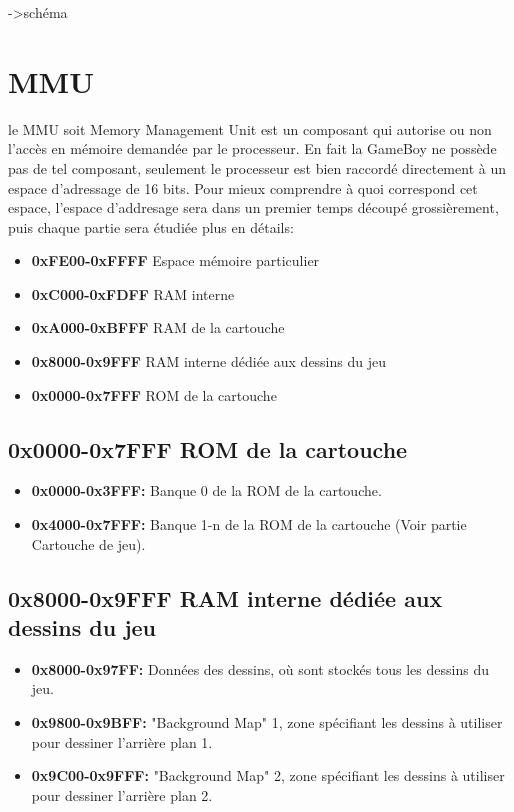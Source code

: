 \documentclass{report}
\begin{document}
->schéma

\section{MMU}
le MMU soit Memory Management Unit est un composant qui autorise ou non l'accès en mémoire demandée par le processeur.
En fait la GameBoy ne possède pas de tel composant, seulement le processeur est bien raccordé directement à un espace d'adressage de 16 bits.
Pour mieux comprendre à quoi correspond cet espace, l'espace d'addresage sera
dans un premier temps découpé grossièrement, puis chaque partie sera étudiée
plus en détails:\\
\begin{itemize}
\item \textbf{0xFE00-0xFFFF} Espace mémoire particulier
\item \textbf{0xC000-0xFDFF} RAM interne
\item \textbf{0xA000-0xBFFF} RAM de la cartouche
\item \textbf{0x8000-0x9FFF} RAM interne dédiée aux dessins du jeu
\item \textbf{0x0000-0x7FFF} ROM de la cartouche
\end{itemize}

\subsection{0x0000-0x7FFF ROM de la cartouche}
\begin{itemize}
\item \textbf{0x0000-0x3FFF:} Banque 0 de la ROM de la cartouche.
\item \textbf{0x4000-0x7FFF:} Banque 1-n de la ROM de la cartouche (Voir partie Cartouche de jeu).
\end{itemize}

\subsection{0x8000-0x9FFF RAM interne dédiée aux dessins du jeu}
\begin{itemize}
\item \textbf{0x8000-0x97FF:} Données des dessins, où sont stockés tous les dessins du jeu.
\item \textbf{0x9800-0x9BFF:} "Background Map" 1, zone spécifiant les dessins à utiliser pour dessiner l'arrière plan 1.
\item \textbf{0x9C00-0x9FFF:} "Background Map" 2, zone spécifiant les dessins à utiliser pour dessiner l'arrière plan 2. 
\end{itemize} 
\end{document}
